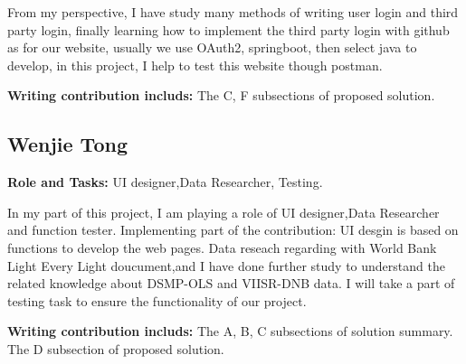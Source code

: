 \documentclass[conference]{IEEEtran}
\begin{document}
From my perspective, I have study many methods of writing user login and third party login,
finally learning how to implement the third party login with github as for our website,
usually we use OAuth2, springboot, then select java to develop, in this project, I help to test
this website though postman.

\textbf{Writing contribution includs:} The C, F subsections of proposed solution.

\subsection{Wenjie Tong} 
\textbf{Role and Tasks:} UI designer,Data Researcher, Testing.

    In my part of this project, I am playing a role of UI designer,Data Researcher and function 
    tester. 
    Implementing part of the contribution:
    UI desgin is based on functions to develop the web pages.
    Data reseach regarding with World Bank Light Every Light doucument,and I have done further 
    study to understand the related knowledge about DSMP-OLS and VIISR-DNB data.
    I will take a part of testing task to ensure the functionality of our project.

\textbf{Writing contribution includs:} The A, B, C subsections of solution summary. 
    The D subsection of proposed solution.
  
\printbibliography
\end{document}
